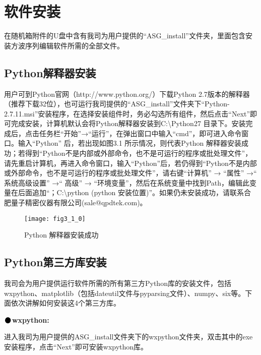\pagestyle{fancy}
\chapter{\heiti 软件安装}
\setmainfont{Times New Roman}

在随机箱附件的U盘中含有我司为用户提供的“ASG\_install”文件夹，里面包含安装方波序列编辑软件所需的全部文件。

\section{Python\heiti 解释器安装}
用户可到Python官网（http://www.python.org/）下载Python 2.7版本的解释器（推荐下载32位），也可运行我司提供的“ASG\_install”文件夹下“Python-2.7.11.msi”安装程序，在选择安装组件时，务必勾选所有组件，然后点击“Next”即可完成安装，计算机默认会将Python解释器安装到C:\textbackslash Python27 目录下。安装完成后，点击任务栏“开始”→“运行”，在弹出窗口中输入“cmd”，即可进入命令窗口。输入“Python” 后，若出现如图3.1 所示情况，则代表Python 解释器安装成功；若得到“Python不是内部或外部命令，也不是可运行的程序或批处理文件”，请先重启计算机，再进入命令窗口，输入“Python”后，若仍得到“Python不是内部或外部命令，也不是可运行的程序或批处理文件”，请右键“计算机” → “属性” →“ 系统高级设置” →“ 高级” → “环境变量”，然后在系统变量中找到Path，编辑此变量在后面追加“；C:\textbackslash python (python 安装位置)”。如果仍未安装成功，请联系合肥量子精密仪器有限公司(sale@qpdtek.com)。
\begin{figure}[ht]
\centering
\texttt{[image: fig3\_1\_0]}
\caption{Python 解释器安装成功}
\end{figure}

\newpage
\section{Python\heiti 第三方库安装}
我司会为用户提供运行软件所需的所有第三方Python库的安装文件，包括wxpython、matplotlib（包括dateutil文件与pyparsing文件）、numpy、six等。下面依次讲解如何安装这4个第三方库。
\vspace{0.3cm}

\noindent$\vcenter{\hbox{\huge$\bullet$}}$\quad\fontsize{12pt}{\baselineskip}\textbf{wxpython:}

进入我司为用户提供的ASG\_install文件夹下的wxpython文件夹，双击其中的exe安装程序，点击“Next”即可安装wxpython库。
\vspace{0.3cm}

